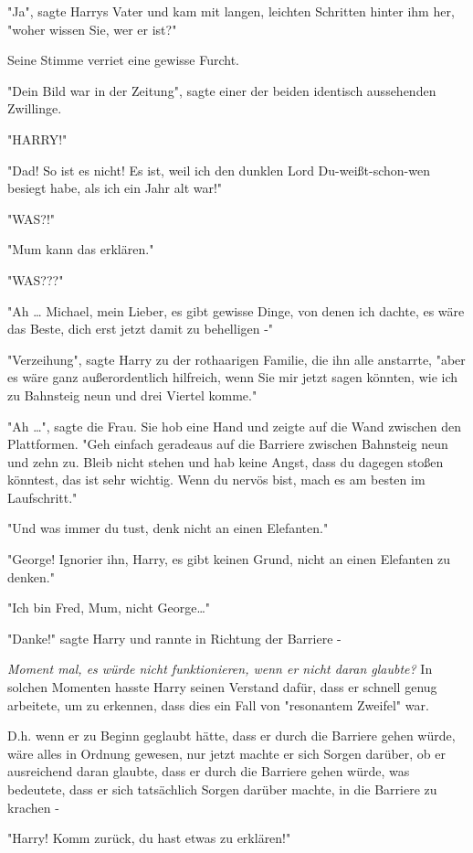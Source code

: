 {"Ja", sagte Harrys Vater und kam mit langen, leichten Schritten hinter ihm her, "woher wissen Sie, wer er ist?"

Seine Stimme verriet eine gewisse Furcht.

"Dein Bild war in der Zeitung", sagte einer der beiden identisch aussehenden Zwillinge.

"HARRY!"

"Dad! So ist es nicht! Es ist, weil ich den dunklen Lord Du-weißt-schon-wen besiegt habe, als ich ein Jahr alt war!"

"WAS?!"

"Mum kann das erklären."

"WAS???"

"Ah … Michael, mein Lieber, es gibt gewisse Dinge, von denen ich dachte, es wäre das Beste, dich erst jetzt damit zu behelligen -"

"Verzeihung", sagte Harry zu der rothaarigen Familie, die ihn alle anstarrte, "aber es wäre ganz außerordentlich hilfreich, wenn Sie mir jetzt sagen könnten, wie ich zu Bahnsteig neun und drei Viertel komme."

"Ah …", sagte die Frau. Sie hob eine Hand und zeigte auf die Wand zwischen den Plattformen. "Geh einfach geradeaus auf die Barriere zwischen Bahnsteig neun und zehn zu. Bleib nicht stehen und hab keine Angst, dass du dagegen stoßen könntest, das ist sehr wichtig. Wenn du nervös bist, mach es am besten im Laufschritt."

"Und was immer du tust, denk nicht an einen Elefanten."

"George! Ignorier ihn, Harry, es gibt keinen Grund, nicht an einen Elefanten zu denken."

"Ich bin Fred, Mum, nicht George…"

"Danke!" sagte Harry und rannte in Richtung der Barriere -

\emph{Moment mal, es würde nicht funktionieren, wenn er nicht daran glaubte?} In solchen Momenten hasste Harry seinen Verstand dafür, dass er schnell genug arbeitete, um zu erkennen, dass dies ein Fall von "resonantem Zweifel" war.

D.h. wenn er zu Beginn geglaubt hätte, dass er durch die Barriere gehen würde, wäre alles in Ordnung gewesen, nur jetzt machte er sich Sorgen darüber, ob er ausreichend daran glaubte, dass er durch die Barriere gehen würde, was bedeutete, dass er sich tatsächlich Sorgen darüber machte, in die Barriere zu krachen -

"Harry! Komm zurück, du hast etwas zu erklären!"

}
